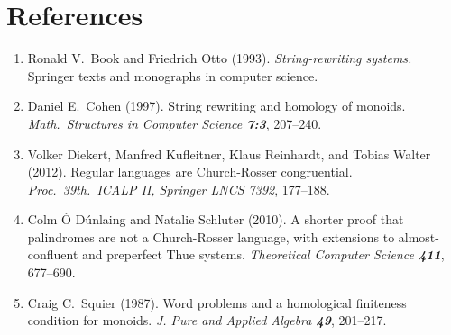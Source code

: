 \documentclass[12pt,a4paper]{article}
\numberwithin{equation}{section}
\begin{document}
\section{References}
\label{references} \begin{enumerate}
\item
\label{bo}
Ronald V.\ Book and Friedrich Otto (1993). {\em String-rewriting
systems.} Springer texts and monographs in computer science.
\item
\label{cohen}
Daniel E.\ Cohen (1997). String rewriting and homology of monoids.
{\em Math.\ Structures in Computer Science \bf 7:3}, 207--240.
\item
\label{dkrw}
Volker Diekert, Manfred Kufleitner, Klaus Reinhardt, and
Tobias  Walter (2012).
Regular languages are Church-Rosser congruential.
{\em Proc.\ 39th.\ ICALP II, Springer LNCS 7392}, 177--188.
\item
\label{ods}
Colm \'O D\'unlaing and Natalie Schluter (2010).
A shorter proof that palindromes are not a Church-Rosser
language, with extensions to almost-confluent and preperfect Thue systems.
{\em Theoretical Computer Science \bf 411}, 677--690.
\item
\label{squier}
Craig C.\ Squier (1987). Word problems and a homological finiteness
condition for monoids. {\em J. Pure and Applied Algebra \bf 49}, 201--217.
\end{enumerate}
\end{document}
